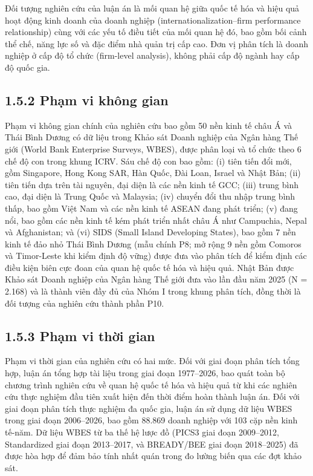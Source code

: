 \documentclass[
  a4paper,
  13pt]{extreport}
\begin{document}
Đối tượng nghiên cứu của luận án là mối quan hệ giữa quốc tế hóa và hiệu
quả hoạt động kinh doanh của doanh nghiệp (internationalization--firm
performance relationship) cùng với các yếu tố điều tiết của mối quan hệ
đó, bao gồm bối cảnh thể chế, năng lực số và đặc điểm nhà quản trị cấp
cao. Đơn vị phân tích là doanh nghiệp ở cấp độ tổ chức (firm-level
analysis), không phải cấp độ ngành hay cấp độ quốc gia.

\hypertarget{phux1ea1m-vi-khuxf4ng-gian}{%
\subsection{1.5.2 Phạm vi không gian}\label{phux1ea1m-vi-khuxf4ng-gian}}

Phạm vi không gian chính của nghiên cứu bao gồm 50 nền kinh tế châu Á và
Thái Bình Dương có dữ liệu trong Khảo sát Doanh nghiệp của Ngân hàng Thế
giới (World Bank Enterprise Surveys, WBES), được phân loại và tổ chức
theo 6 chế độ con trong khung ICRV. Sáu chế độ con bao gồm: (i) tiên
tiến đổi mới, gồm Singapore, Hong Kong SAR, Hàn Quốc, Đài Loan, Israel
và Nhật Bản; (ii) tiên tiến dựa trên tài nguyên, đại diện là các nền
kinh tế GCC; (iii) trung bình cao, đại diện là Trung Quốc và Malaysia;
(iv) chuyển đổi thu nhập trung bình thấp, bao gồm Việt Nam và các nền
kinh tế ASEAN đang phát triển; (v) đang nổi, bao gồm các nền kinh tế kém
phát triển nhất châu Á như Campuchia, Nepal và Afghanistan; và (vi) SIDS
(Small Island Developing States), bao gồm 7 nền kinh tế đảo nhỏ Thái
Bình Dương (mẫu chính P8; mở rộng 9 nền gồm Comoros và Timor-Leste khi
kiểm định độ vững) được đưa vào phân tích để kiểm định các điều kiện
biên cực đoan của quan hệ quốc tế hóa và hiệu quả. Nhật Bản được Khảo
sát Doanh nghiệp của Ngân hàng Thế giới đưa vào lần đầu năm 2025 (N =
2.168) và là thành viên đầy đủ của Nhóm I trong khung phân tích, đồng
thời là đối tượng của nghiên cứu thành phần P10.

\hypertarget{phux1ea1m-vi-thux1eddi-gian}{%
\subsection{1.5.3 Phạm vi thời gian}\label{phux1ea1m-vi-thux1eddi-gian}}

Phạm vi thời gian của nghiên cứu có hai mức. Đối với giai đoạn phân tích
tổng hợp, luận án tổng hợp tài liệu trong giai đoạn 1977--2026, bao quát
toàn bộ chương trình nghiên cứu về quan hệ quốc tế hóa và hiệu quả từ
khi các nghiên cứu thực nghiệm đầu tiên xuất hiện đến thời điểm hoàn
thành luận án. Đối với giai đoạn phân tích thực nghiệm đa quốc gia, luận
án sử dụng dữ liệu WBES trong giai đoạn 2006--2026, bao gồm 88.869 doanh
nghiệp với 103 cặp nền kinh tế-năm. Dữ liệu WBES từ ba thế hệ lược đồ
(PICS3 giai đoạn 2009--2012, Standardized giai đoạn 2013--2017, và
BREADY/BEE giai đoạn 2018--2025) đã được hòa hợp để đảm bảo tính nhất
quán trong đo lường biến qua các đợt khảo sát.
\end{document}
